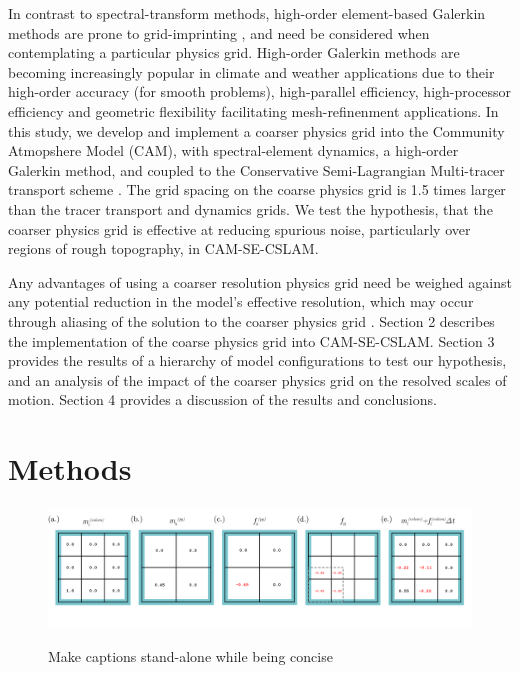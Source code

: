 \documentclass{agujournal}
\begin{document}
In contrast to spectral-transform methods, high-order element-based Galerkin methods are prone to grid-imprinting \citep{HL2018MWR}, and need be considered when contemplating a particular physics grid. High-order Galerkin methods are becoming increasingly popular in climate and weather applications due to their high-order accuracy (for smooth problems), high-parallel efficiency, high-processor efficiency and geometric flexibility facilitating mesh-refinenment applications. In this study, we develop and implement a coarser physics grid into the Community Atmopshere Model (CAM), with spectral-element dynamics, a high-order Galerkin method, and coupled to the Conservative Semi-Lagrangian Multi-tracer transport scheme \citep[CAM-SE-CSLAM; ][]{LTOUNGK2017MWR}. The grid spacing on the coarse physics grid is 1.5 times larger than the tracer transport and dynamics grids. We test the hypothesis, that the coarser physics grid is effective at reducing spurious noise, particularly over regions of rough topography, in CAM-SE-CSLAM. 


Any advantages of using a coarser resolution physics grid need be weighed against any potential reduction in the model's effective resolution, which may occur through aliasing of the solution to the coarser physics grid \citep{W1999T}. Section 2 describes the implementation of the coarse physics grid into CAM-SE-CSLAM. Section 3 provides the results of a hierarchy of model configurations to test our hypothesis, and an analysis of the impact of the coarser physics grid on the resolved scales of motion. Section 4 provides a discussion of the results and conclusions.

\section{Methods}


\begin{figure}[t]
\begin{center}
\noindent\includegraphics[width=30pc,angle=0]{figs/alg-schematic.png}\\
\end{center}
\caption{Make captions stand-alone while being concise}
\label{fig:alg-schematic}
\end{figure}
\end{document}
